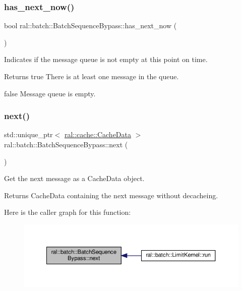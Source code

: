 \subsubsection{\texorpdfstring{has\+\_\+next\+\_\+now()}{has\_next\_now()}}
{\footnotesize\ttfamily bool ral\+::batch\+::\+Batch\+Sequence\+Bypass\+::has\+\_\+next\+\_\+now (\begin{DoxyParamCaption}{ }\end{DoxyParamCaption})}

Indicates if the message queue is not empty at this point on time. \begin{DoxyReturn}{Returns}
true There is at least one message in the queue. 

false Message queue is empty. 
\end{DoxyReturn}
\mbox{\label{classral_1_1batch_1_1BatchSequenceBypass_a5d55f785961b21c82578223ab5a0a217}} 
\subsubsection{\texorpdfstring{next()}{next()}}
{\footnotesize\ttfamily std\+::unique\+\_\+ptr$<$ \hyperlink{classral_1_1cache_1_1CacheData}{ral\+::cache\+::\+Cache\+Data} $>$ ral\+::batch\+::\+Batch\+Sequence\+Bypass\+::next (\begin{DoxyParamCaption}{ }\end{DoxyParamCaption})}

Get the next message as a Cache\+Data object. \begin{DoxyReturn}{Returns}
Cache\+Data containing the next message without decacheing. 
\end{DoxyReturn}
Here is the caller graph for this function\+:\nopagebreak
\begin{figure}[H]
\begin{center}
\leavevmode
\includegraphics[width=350pt]{classral_1_1batch_1_1BatchSequenceBypass_a5d55f785961b21c82578223ab5a0a217_icgraph}
\end{center}
\end{figure}
\mbox{\label{classral_1_1batch_1_1BatchSequenceBypass_aaf3b8397046f0ad622a49c751861d983}} 
